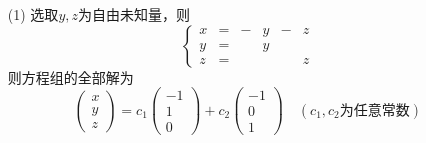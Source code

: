 \begin{jie}
\begin{itemize}
\item[(1)] 选取$y,z$为自由未知量，则
  $$
  \left\{
    \begin{array}{cccccc}
      x&=&-&y&-&z\\
      y&=&&y&&\\
      z&=&&&&z
    \end{array}
  \right.
  $$
  则方程组的全部解为
  $$
  \left(
    \begin{array}{r}
      x\\y\\z
    \end{array}
  \right) = c_1      \left(
    \begin{array}{r}
      -1\\1\\0
    \end{array}
  \right) + c_2      \left(
    \begin{array}{r}
      -1\\0\\1
    \end{array}
  \right) \quad (c_1,c_2\mbox{为任意常数})
  $$
\end{itemize}






\end{jie}
